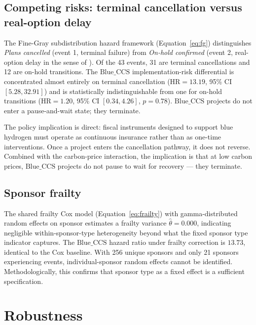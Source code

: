 \documentclass[11pt,a4paper]{article}
\newcommand{\HR}{\mathrm{HR}}
\newcommand{\BlueCCS}{\mathrm{Blue\_CCS}}
\begin{document}
\subsection{Competing risks: terminal cancellation versus real-option delay}

The Fine-Gray subdistribution hazard framework (Equation~\ref{eq:fg}) distinguishes \textit{Plans cancelled} (event 1, terminal failure) from \textit{On-hold confirmed} (event 2, real-option delay in the sense of \citet{DixitPindyck1994}). Of the 43 events, 31 are terminal cancellations and 12 are on-hold transitions. The $\BlueCCS$ implementation-risk differential is concentrated almost entirely on terminal cancellation ($\HR = 13.19$, 95\% CI $[5.28, 32.91]$) and is statistically indistinguishable from one for on-hold transitions ($\HR = 1.20$, 95\% CI $[0.34, 4.26]$, $p = 0.78$). $\BlueCCS$ projects do not enter a pause-and-wait state; they terminate.

The policy implication is direct: fiscal instruments designed to support blue hydrogen must operate as continuous insurance rather than as one-time interventions. Once a project enters the cancellation pathway, it does not reverse. Combined with the carbon-price interaction, the implication is that at low carbon prices, $\BlueCCS$ projects do not pause to wait for recovery --- they terminate.

\subsection{Sponsor frailty}

The shared frailty Cox model (Equation~\ref{eq:frailty}) with gamma-distributed random effects on sponsor estimates a frailty variance $\hat\theta = 0.000$, indicating negligible within-sponsor-type heterogeneity beyond what the fixed sponsor type indicator captures. The $\BlueCCS$ hazard ratio under frailty correction is $13.73$, identical to the Cox baseline. With 256 unique sponsors and only 21 sponsors experiencing events, individual-sponsor random effects cannot be identified. Methodologically, this confirms that sponsor type as a fixed effect is a sufficient specification.

\section{Robustness}
\end{document}
